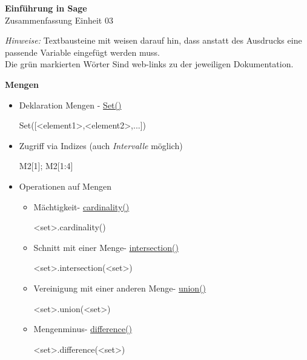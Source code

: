 \documentclass[a4paper,9pt,DIV15,twocolumn]{scrartcl}
\begin{document}
\begin{center}
    \textbf{\LARGE Einführung in Sage}\\
    {\large Zusammenfassung Einheit 03}
\end{center}
\textsl{Hinweise:} Textbausteine mit  weisen darauf hin, dass anstatt des Ausdrucks eine passende Variable eingefügt werden muss.\\
Die {\color{Green}grün} markierten Wörter Sind web-links zu der jeweiligen Dokumentation.
\medskip

\textbf{Mengen}

\begin{itemize}
 \item Deklaration Mengen - \href{https://sage.math.uni-goettingen.de/doc/static/reference/sage/sets/set.html#sage.sets.set.Set}{Set()} 
\begin{sagein}
Set([<element1>,<element2>,...])
\end{sagein}
 \item Zugriff via Indizes (auch \emph{Intervalle} möglich)
\begin{sagein}
M2[1]; M2[1:4]
\end{sagein}
 \item Operationen auf Mengen
\begin{itemize}

 \item Mächtigkeit- \href{https://sage.math.uni-goettingen.de/doc/static/reference/sage/sets/set.html#sage.sets.set.Set_object_difference.cardinality}{cardinality()}
\begin{sagein}
<set>.cardinality()
\end{sagein}

 \item Schnitt mit einer Menge- \href{https://sage.math.uni-goettingen.de/doc/static/reference/sage/sets/set.html#sage.sets.set.Set_object.intersection}{intersection()}
\begin{sagein}
<set>.intersection(<set>)
\end{sagein}

 \item Vereinigung mit einer anderen Menge- \href{https://sage.math.uni-goettingen.de/doc/static/reference/sage/sets/set.html#sage.sets.set.Set_object.union}{union()}
\begin{sagein}
<set>.union(<set>)
\end{sagein}

 \item Mengenminus- \href{https://sage.math.uni-goettingen.de/doc/static/reference/sage/sets/set.html#sage.sets.set.Set_object.difference}{difference()}
\begin{sagein}
<set>.difference(<set>)
\end{sagein}


\end{itemize}
\end{itemize}
\end{document}
